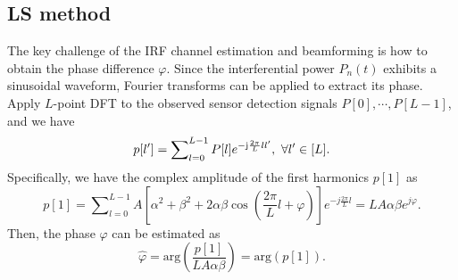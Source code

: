 \documentclass[12pt,draftclsnofoot,journal,onecolumn]{IEEEtran}
\theoremstyle{nonumberplain}
\def \arg {\text{arg}}
\begin{document}
\subsection{LS method}
    The key challenge of the IRF channel estimation and beamforming is how to obtain the phase difference $\varphi$. Since the interferential power $P_n(t)$ exhibits a sinusoidal waveform, Fourier transforms can be applied to extract its phase. Apply $L$-point \ac{DFT} to the observed sensor detection signals $P[0],\cdots ,P[L-1]$, and we have
    \begin{equation}
        \label{DFT}
        p[l']=\sum\nolimits_{l=0}^{L-1}P[l]e^{-{\rm j}\frac{2\pi}{L}ll'},~\forall l'\in [L].
    \end{equation}
    Specifically, we have the complex amplitude of the first harmonics $p[1]$ as 
    \begin{equation}
        \label{DFT l=1}
        p[1]=\sum\nolimits_{l=0}^{L-1}A\left[\alpha^{2}+\beta^{2}+2\alpha\beta\cos\left(\frac{2\pi}{L}l+\varphi\right)\right]e^{-j\frac{2\pi}{L}l}=LA\alpha\beta  e^{j\varphi}.
    \end{equation}
    Then, the phase $\varphi$ can be estimated as
    \begin{equation}
        \label{LS estimate result}
        \hat{\varphi}=\arg\left(\frac{p[1]}{LA\alpha\beta}\right) = \arg\left(p[1]\right).
    \end{equation}

\end{document}
